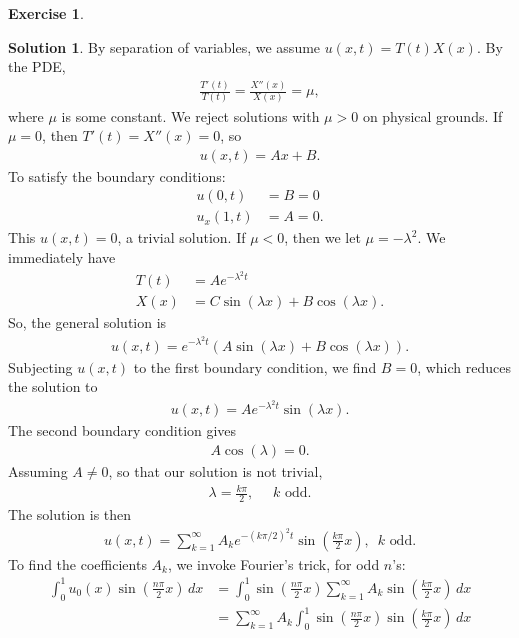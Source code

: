 \documentclass{book}
\theoremstyle{definition}
\newtheorem*{exer*}{Exercise}
\newtheorem*{sln*}{Solution}
\begin{document}
\begin{exer*}
\begin{sln*}
		\noindent By separation of variables, we assume $u(x,t) = T(t)X(x)$. By the PDE, 
		\begin{align*}
		\frac{T'(t)}{T(t)} = \frac{X''(x)}{X(x)} = \mu,
		\end{align*}
		where $\mu$ is some constant. We reject solutions with $\mu > 0$ on physical grounds. If $\mu = 0$, then $T'(t) = X''(x) = 0$, so
		\begin{align*}
		u(x,t) = Ax + B.
		\end{align*}
		To satisfy the boundary conditions:
		\begin{align*}
		u(0,t) &= B = 0\\
		u_x(1,t) &= A = 0.
		\end{align*}
		This $u(x,t) = 0$, a trivial solution. If $\mu < 0$, then we let $\mu = -\lambda^2$. We immediately have
		\begin{align*}
		T(t) &= Ae^{-\lambda^2 t}\\
		X(x) &= C\sin(\lambda x) + B\cos(\lambda x).
		\end{align*}
		So, the general solution is
		\begin{align*}
		u(x,t) = e^{-\lambda^2 t}(A\sin(\lambda x) + B\cos(\lambda x)).
		\end{align*}
		Subjecting $u(x,t)$ to the first boundary condition, we find $B = 0$, which reduces the solution to
		\begin{align*}
		u(x,t) = Ae^{-\lambda^2 t}\sin(\lambda x).
		\end{align*}
		The second boundary condition gives
		\begin{align*}
		A\cos(\lambda)= 0.
		\end{align*}
		Assuming $A\neq 0$, so that our solution is not trivial, 
		\begin{align*}
		\lambda = \frac{k\pi}{2},\,\,\,\,\,\,\,\, k \text{ odd}.
		\end{align*}
		The solution is then
		\begin{align*}
		u(x,t) = \sum_{k=1}^{\infty}A_ke^{-(k\pi/2)^2t}\sin\left(\frac{k\pi}{2} x\right), \,\,\, k \text{ odd}.
		\end{align*}
		To find the coefficients $A_k$, we invoke Fourier's trick, for odd $n$'s:
		\begin{align*}
		\int_{0}^1 u_0(x)\sin\left(\frac{n\pi}{2} x\right)\,dx &= \int_0^1 \sin\left(\frac{n\pi}{2} x\right)\sum_{k=1}^\infty A_k\sin\left(\frac{k\pi}{2} x\right)\,dx\\
		&= \sum_{k=1}^\infty A_k \int_{0}^1 \sin\left(\frac{n\pi}{2} x\right)\sin\left(\frac{k\pi}{2} x\right)\,dx\\

\end{align*}
\end{sln*}
\end{exer*}
\end{document}

